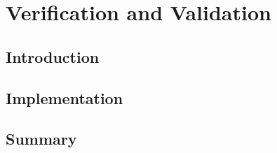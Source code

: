 \chapter{Verification and Validation}
\section{Introduction}
\section{Implementation}



\section{Summary}